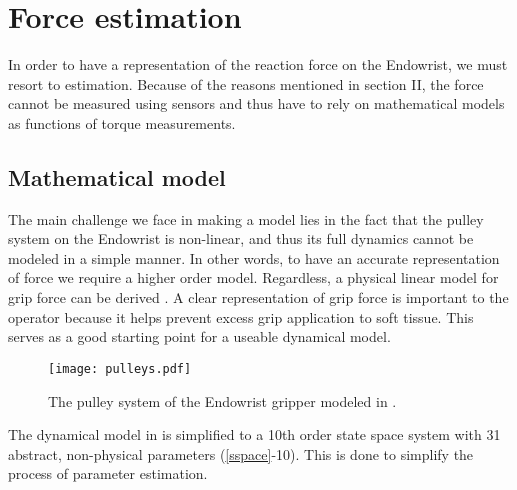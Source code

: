 \section{Force estimation}
In order to have a representation of the reaction force on the Endowrist, we must resort to estimation.
Because of the reasons mentioned in section II, the force cannot be measured using sensors and thus have to rely on mathematical models as functions of torque measurements.

\subsection{Mathematical model}
The main challenge we face in making a model lies in the fact that the pulley system on the Endowrist is non-linear, and thus its full dynamics cannot be modeled in a simple manner. In other words, to have an accurate representation of force we require a higher order model.
Regardless, a physical linear model for grip force can be derived \cite{kim2014dynamic}.
A clear representation of grip force is important to the operator because it helps prevent excess grip application to soft tissue.
This serves as a good starting point for a useable dynamical model.

\begin{figure}
\centering
\texttt{[image: pulleys.pdf]}
\caption{The pulley system of the Endowrist gripper modeled in \cite{kim2014dynamic}.}
\end{figure}

The dynamical model in \cite{kim2014dynamic} is simplified to a 10th order state space system with 31 abstract, non-physical parameters (\ref{sspace}-10).
This is done to simplify the process of parameter estimation.


